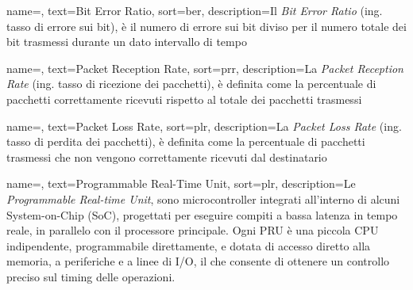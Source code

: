  {
    name=,
    text=Bit Error Ratio,
    sort=ber,
    description={Il \emph{Bit Error Ratio} (ing. tasso di errore sui bit), è il numero di errore sui bit diviso per il numero totale dei bit trasmessi durante un dato intervallo di tempo}
}

 {
    name=,
    text=Packet Reception Rate,
    sort=prr,
    description={La \emph{Packet Reception Rate} (ing. tasso di ricezione dei pacchetti), è definita come la percentuale di pacchetti correttamente ricevuti rispetto al totale dei pacchetti trasmessi}
}

 {
    name=,
    text=Packet Loss Rate,
    sort=plr,
    description={La \emph{Packet Loss Rate} (ing. tasso di perdita dei pacchetti), è definita come la percentuale di pacchetti trasmessi che non vengono correttamente ricevuti dal destinatario}
}

 {
    name=,
    text=Programmable Real-Time Unit,
    sort=plr,
    description={Le \emph{Programmable Real-time Unit}, sono microcontroller integrati all'interno di alcuni System-on-Chip (SoC), progettati per eseguire compiti a bassa latenza in tempo reale, in parallelo con il processore principale. Ogni PRU è una piccola CPU indipendente, programmabile direttamente, e dotata di accesso diretto alla memoria, a periferiche e a linee di I/O, il che consente di ottenere un controllo preciso sul timing delle operazioni.}
}